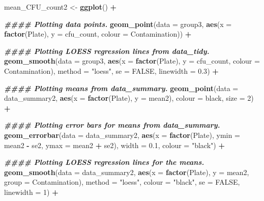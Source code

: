 \documentclass[
]{article}
\newenvironment{Shaded}{\begin{snugshade}}{\end{snugshade}}
\newcommand{\AttributeTok}[1]{\textcolor[rgb]{0.13,0.29,0.53}{#1}}
\newcommand{\ConstantTok}[1]{\textcolor[rgb]{0.56,0.35,0.01}{#1}}
\newcommand{\DecValTok}[1]{\textcolor[rgb]{0.00,0.00,0.81}{#1}}
\newcommand{\DocumentationTok}[1]{\textcolor[rgb]{0.56,0.35,0.01}{\textbf{\textit{#1}}}}
\newcommand{\FloatTok}[1]{\textcolor[rgb]{0.00,0.00,0.81}{#1}}
\newcommand{\FunctionTok}[1]{\textcolor[rgb]{0.13,0.29,0.53}{\textbf{#1}}}
\newcommand{\NormalTok}[1]{#1}
\newcommand{\OtherTok}[1]{\textcolor[rgb]{0.56,0.35,0.01}{#1}}
\newcommand{\SpecialCharTok}[1]{\textcolor[rgb]{0.81,0.36,0.00}{\textbf{#1}}}
\newcommand{\StringTok}[1]{\textcolor[rgb]{0.31,0.60,0.02}{#1}}
\begin{document}
\begin{Shaded}
\begin{Highlighting}[]
\NormalTok{mean\_CFU\_count2 }\OtherTok{\textless{}{-}} \FunctionTok{ggplot}\NormalTok{() }\SpecialCharTok{+}
  
  \DocumentationTok{\#\#\#\# Plotting data points.}
  \FunctionTok{geom\_point}\NormalTok{(}\AttributeTok{data =}\NormalTok{ group3,}
             \FunctionTok{aes}\NormalTok{(}\AttributeTok{x =} \FunctionTok{factor}\NormalTok{(Plate), }
                 \AttributeTok{y =}\NormalTok{ cfu\_count, }
                 \AttributeTok{colour =}\NormalTok{ Contamination)) }\SpecialCharTok{+}
  
  \DocumentationTok{\#\#\#\# Plotting LOESS regression lines from data\_tidy.}
  \FunctionTok{geom\_smooth}\NormalTok{(}\AttributeTok{data =}\NormalTok{ group3,}
              \FunctionTok{aes}\NormalTok{(}\AttributeTok{x =} \FunctionTok{factor}\NormalTok{(Plate), }
                  \AttributeTok{y =}\NormalTok{ cfu\_count, }
                  \AttributeTok{colour =}\NormalTok{ Contamination), }
              \AttributeTok{method =} \StringTok{"loess"}\NormalTok{, }
              \AttributeTok{se =} \ConstantTok{FALSE}\NormalTok{,}
              \AttributeTok{linewidth =} \FloatTok{0.3}\NormalTok{) }\SpecialCharTok{+}
  
  \DocumentationTok{\#\#\#\# Plotting means from data\_summary.}
  \FunctionTok{geom\_point}\NormalTok{(}\AttributeTok{data =}\NormalTok{ data\_summary2, }
             \FunctionTok{aes}\NormalTok{(}\AttributeTok{x =} \FunctionTok{factor}\NormalTok{(Plate), }
                 \AttributeTok{y =}\NormalTok{ mean2), }
             \AttributeTok{colour =} \StringTok{\textquotesingle{}black\textquotesingle{}}\NormalTok{, }
             \AttributeTok{size =} \DecValTok{2}\NormalTok{) }\SpecialCharTok{+}
  
  \DocumentationTok{\#\#\#\# Plotting error bars for means from data\_summary.}
  \FunctionTok{geom\_errorbar}\NormalTok{(}\AttributeTok{data =}\NormalTok{ data\_summary2,}
                \FunctionTok{aes}\NormalTok{(}\AttributeTok{x =} \FunctionTok{factor}\NormalTok{(Plate), }
                    \AttributeTok{ymin =}\NormalTok{ mean2 }\SpecialCharTok{{-}}\NormalTok{ se2, }
                    \AttributeTok{ymax =}\NormalTok{ mean2 }\SpecialCharTok{+}\NormalTok{ se2), }
                \AttributeTok{width =} \FloatTok{0.1}\NormalTok{, }
                \AttributeTok{colour =} \StringTok{"black"}\NormalTok{) }\SpecialCharTok{+}
  
  \DocumentationTok{\#\#\#\# Plotting LOESS regression lines for the means.}
  \FunctionTok{geom\_smooth}\NormalTok{(}\AttributeTok{data =}\NormalTok{ data\_summary2,}
              \FunctionTok{aes}\NormalTok{(}\AttributeTok{x =} \FunctionTok{factor}\NormalTok{(Plate), }
                  \AttributeTok{y =}\NormalTok{ mean2,}
                  \AttributeTok{group =}\NormalTok{ Contamination), }
              \AttributeTok{method =} \StringTok{"loess"}\NormalTok{, }
              \AttributeTok{colour =} \StringTok{"black"}\NormalTok{,}
              \AttributeTok{se =} \ConstantTok{FALSE}\NormalTok{, }
              \AttributeTok{linewidth =} \DecValTok{1}\NormalTok{) }\SpecialCharTok{+}
  

\end{Highlighting}
\end{Shaded}
\end{document}
